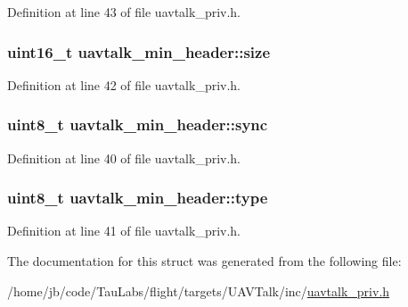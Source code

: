 \-Definition at line 43 of file uavtalk\-\_\-priv.\-h.

\hypertarget{structuavtalk__min__header_a7f75bcff0b29fb58f7ca4640b5be8eb6}{
\subsubsection[{size}]{\setlength{\rightskip}{0pt plus 5cm}uint16\-\_\-t {\bf uavtalk\-\_\-min\-\_\-header\-::size}}}\label{structuavtalk__min__header_a7f75bcff0b29fb58f7ca4640b5be8eb6}


\-Definition at line 42 of file uavtalk\-\_\-priv.\-h.

\hypertarget{structuavtalk__min__header_a1f264cf34649646db13e6ce6dbf93ef8}{
\subsubsection[{sync}]{\setlength{\rightskip}{0pt plus 5cm}uint8\-\_\-t {\bf uavtalk\-\_\-min\-\_\-header\-::sync}}}\label{structuavtalk__min__header_a1f264cf34649646db13e6ce6dbf93ef8}


\-Definition at line 40 of file uavtalk\-\_\-priv.\-h.

\hypertarget{structuavtalk__min__header_a50b5dda063861e09e6275d4cc108bcd8}{
\subsubsection[{type}]{\setlength{\rightskip}{0pt plus 5cm}uint8\-\_\-t {\bf uavtalk\-\_\-min\-\_\-header\-::type}}}\label{structuavtalk__min__header_a50b5dda063861e09e6275d4cc108bcd8}


\-Definition at line 41 of file uavtalk\-\_\-priv.\-h.



\-The documentation for this struct was generated from the following file\-:\begin{DoxyCompactItemize}
\item 
/home/jb/code/\-Tau\-Labs/flight/targets/\-U\-A\-V\-Talk/inc/\hyperlink{uavtalk__priv_8h}{uavtalk\-\_\-priv.\-h}\end{DoxyCompactItemize}
